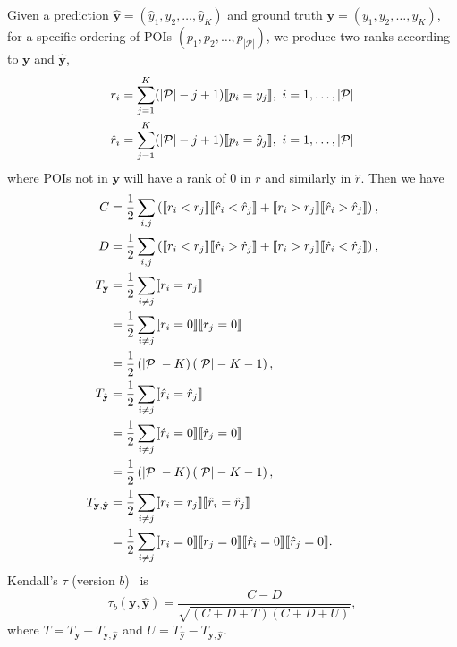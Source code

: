 Given a prediction $\hat{\mathbf{y}} = (\hat{y}_1, \hat{y}_2, \dots, \hat{y}_K)$ and ground truth $\mathbf{y} = (y_1, y_2, \dots, y_K)$,
for a specific ordering of POIs $(p_1, p_2, \dots, p_{|\mathcal{P}|})$,
we produce two ranks according to $\mathbf{y}$ and $\hat{\mathbf{y}}$,
\begin{align*}
r_i       &= \sum_{j=1}^K (| \mathcal{P} | - j + 1)  \llbracket p_i = y_j \rrbracket,~
i = 1, \dots, | \mathcal{P} | \\
\hat{r}_i &= \sum_{j=1}^K (| \mathcal{P} | - j + 1)  \llbracket p_i = \hat{y}_j \rrbracket,~
i = 1, \dots, | \mathcal{P} |
\end{align*}
where POIs not in $\mathbf{y}$ will have a rank of $0$ in $r$ and similarly in $\hat{r}$.
Then we have
\begin{align*}
C &= \frac{1}{2} \sum_{i,j} \left(\llbracket r_i < r_j \rrbracket  \llbracket \hat{r}_i < \hat{r}_j \rrbracket +
     \llbracket r_i > r_j \rrbracket  \llbracket \hat{r}_i > \hat{r}_j \rrbracket \right), \\
D &= \frac{1}{2} \sum_{i,j} \left(\llbracket r_i < r_j \rrbracket  \llbracket \hat{r}_i > \hat{r}_j \rrbracket +
     \llbracket r_i > r_j \rrbracket  \llbracket \hat{r}_i < \hat{r}_j \rrbracket \right), \\
T_{\mathbf{y}} &= \frac{1}{2} \sum_{i \ne j} \llbracket r_i = r_j \rrbracket \\
               &= \frac{1}{2} \sum_{i \ne j} \llbracket r_i = 0 \rrbracket  \llbracket r_j = 0 \rrbracket \\
               &= \frac{1}{2} \left( |\mathcal{P}| - K \right) \left( |\mathcal{P}| - K - 1 \right), \\
T_{\hat{\mathbf{y}}} &= \frac{1}{2} \sum_{i \ne j} \llbracket \hat{r}_i = \hat{r}_j \rrbracket \\
                     &= \frac{1}{2} \sum_{i \ne j} \llbracket \hat{r}_i = 0 \rrbracket  \llbracket \hat{r}_j = 0 \rrbracket \\
                     &= \frac{1}{2} \left( |\mathcal{P}| - K \right) \left( |\mathcal{P}| - K - 1 \right), \\
T_{\mathbf{y},\hat{\mathbf{y}}} &= \frac{1}{2} \sum_{i \ne j} \llbracket r_i = r_j \rrbracket  \llbracket \hat{r}_i = \hat{r}_j \rrbracket \\
                                &= \frac{1}{2} \sum_{i \ne j} \llbracket r_i = 0 \rrbracket  \llbracket r_j = 0 \rrbracket
                                   \llbracket \hat{r}_i = 0 \rrbracket  \llbracket \hat{r}_j = 0 \rrbracket.
\end{align*}
Kendall's $\tau$ (version $b$)~\cite{kendall1945,agresti2010analysis} is
\begin{equation*}
\tau_b(\mathbf{y}, \hat{\mathbf{y}}) = \frac{C - D}{\sqrt{(C + D + T) (C + D + U)}},
\end{equation*}
where $T = T_{\mathbf{y}} - T_{\mathbf{y},\hat{\mathbf{y}}}$ and $U = T_{\hat{\mathbf{y}}} - T_{\mathbf{y},\hat{\mathbf{y}}}$.

